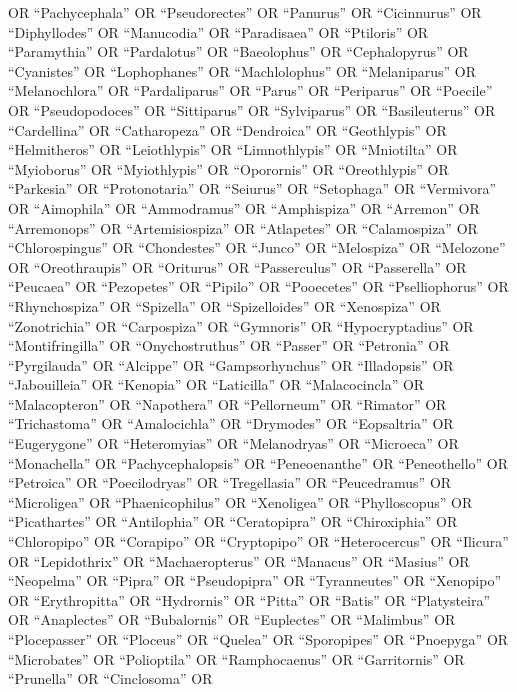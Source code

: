 \documentclass[
  number,
  review,
  onecolumn]{elsarticle}
\begin{document}
OR ``Pachycephala'' OR ``Pseudorectes'' OR ``Panurus'' OR ``Cicinnurus''
OR ``Diphyllodes'' OR ``Manucodia'' OR ``Paradisaea'' OR ``Ptiloris'' OR
``Paramythia'' OR ``Pardalotus'' OR ``Baeolophus'' OR ``Cephalopyrus''
OR ``Cyanistes'' OR ``Lophophanes'' OR ``Machlolophus'' OR
``Melaniparus'' OR ``Melanochlora'' OR ``Pardaliparus'' OR ``Parus'' OR
``Periparus'' OR ``Poecile'' OR ``Pseudopodoces'' OR ``Sittiparus'' OR
``Sylviparus'' OR ``Basileuterus'' OR ``Cardellina'' OR ``Catharopeza''
OR ``Dendroica'' OR ``Geothlypis'' OR ``Helmitheros'' OR ``Leiothlypis''
OR ``Limnothlypis'' OR ``Mniotilta'' OR ``Myioborus'' OR ``Myiothlypis''
OR ``Oporornis'' OR ``Oreothlypis'' OR ``Parkesia'' OR ``Protonotaria''
OR ``Seiurus'' OR ``Setophaga'' OR ``Vermivora'' OR ``Aimophila'' OR
``Ammodramus'' OR ``Amphispiza'' OR ``Arremon'' OR ``Arremonops'' OR
``Artemisiospiza'' OR ``Atlapetes'' OR ``Calamospiza'' OR
``Chlorospingus'' OR ``Chondestes'' OR ``Junco'' OR ``Melospiza'' OR
``Melozone'' OR ``Oreothraupis'' OR ``Oriturus'' OR ``Passerculus'' OR
``Passerella'' OR ``Peucaea'' OR ``Pezopetes'' OR ``Pipilo'' OR
``Pooecetes'' OR ``Pselliophorus'' OR ``Rhynchospiza'' OR ``Spizella''
OR ``Spizelloides'' OR ``Xenospiza'' OR ``Zonotrichia'' OR
``Carpospiza'' OR ``Gymnoris'' OR ``Hypocryptadius'' OR
``Montifringilla'' OR ``Onychostruthus'' OR ``Passer'' OR ``Petronia''
OR ``Pyrgilauda'' OR ``Alcippe'' OR ``Gampsorhynchus'' OR ``Illadopsis''
OR ``Jabouilleia'' OR ``Kenopia'' OR ``Laticilla'' OR ``Malacocincla''
OR ``Malacopteron'' OR ``Napothera'' OR ``Pellorneum'' OR ``Rimator'' OR
``Trichastoma'' OR ``Amalocichla'' OR ``Drymodes'' OR ``Eopsaltria'' OR
``Eugerygone'' OR ``Heteromyias'' OR ``Melanodryas'' OR ``Microeca'' OR
``Monachella'' OR ``Pachycephalopsis'' OR ``Peneoenanthe'' OR
``Peneothello'' OR ``Petroica'' OR ``Poecilodryas'' OR ``Tregellasia''
OR ``Peucedramus'' OR ``Microligea'' OR ``Phaenicophilus'' OR
``Xenoligea'' OR ``Phylloscopus'' OR ``Picathartes'' OR ``Antilophia''
OR ``Ceratopipra'' OR ``Chiroxiphia'' OR ``Chloropipo'' OR ``Corapipo''
OR ``Cryptopipo'' OR ``Heterocercus'' OR ``Ilicura'' OR ``Lepidothrix''
OR ``Machaeropterus'' OR ``Manacus'' OR ``Masius'' OR ``Neopelma'' OR
``Pipra'' OR ``Pseudopipra'' OR ``Tyranneutes'' OR ``Xenopipo'' OR
``Erythropitta'' OR ``Hydrornis'' OR ``Pitta'' OR ``Batis'' OR
``Platysteira'' OR ``Anaplectes'' OR ``Bubalornis'' OR ``Euplectes'' OR
``Malimbus'' OR ``Plocepasser'' OR ``Ploceus'' OR ``Quelea'' OR
``Sporopipes'' OR ``Pnoepyga'' OR ``Microbates'' OR ``Polioptila'' OR
``Ramphocaenus'' OR ``Garritornis'' OR ``Prunella'' OR ``Cinclosoma'' OR
\end{document}
